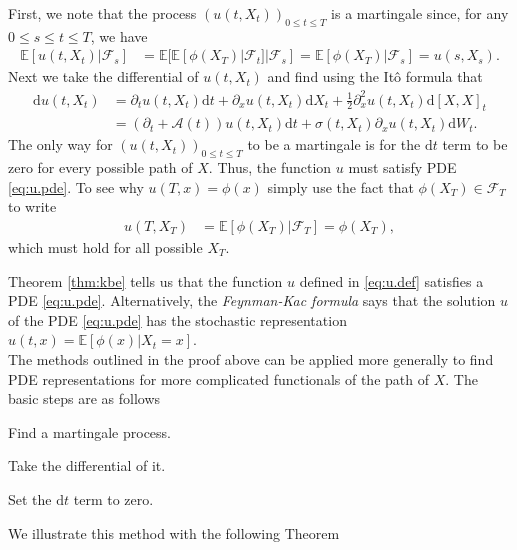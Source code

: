 \documentclass[12pt]{book}
\let\varphi\phi
\numberwithin{equation}{chapter}
\theoremstyle{plain}
\numberwithin{theorem}{section}
\theoremstyle{definition}
\numberwithin{exercise}{chapter}
\let\oldendproof\endproof
\renewenvironment{proof}[1][\proofname]{%
  \oldproof[\scshape\underline{#1}]%
}{\oldendproof}
\newcommand{\<}{\langle}
\renewcommand{\>}{\rangle}
\renewcommand{\(}{\left(}
\renewcommand{\)}{\right)}
\renewcommand{\[}{\left[}
\renewcommand{\]}{\right]}
\newcommand\Eb{\mathds{E}}
\newcommand\Ac{\mathscr{A}}
\newcommand\Fc{\mathscr{F}}
\newcommand\sig{\sigma}
\renewcommand\d{\partial}
\newcommand\dd{\mathrm{d}}
\begin{document}
\begin{proof}
First, we note that the process $(u(t,X_t))_{0 \leq t \leq T}$ is a martingale since, for any $0 \leq s \leq t \leq T$, we have
\begin{align}
\Eb[ u(t,X_t) | \Fc_s ]
	&=	\Eb[\Eb[ \varphi(X_T) | \Fc_t ] | \Fc_s ] 
	=		\Eb[ \varphi(X_T) | \Fc_s ]
	=		u(s,X_s) .
\end{align}
Next we take the differential of $u(t,X_t)$ and find using the It\^o formula that
\begin{align}
\dd u(t,X_t)
	&=	\d_t u(t,X_t) \dd t + \d_x u(t,X_t) \dd X_t + \tfrac{1}{2} \d_x^2 u(t,X_t) \dd[X,X]_t \\
	&=	\( \d_t + \Ac(t) \) u(t,X_t) \dd t + \sig(t,X_t) \d_x u(t,X_t) \dd W_t .
\end{align}
The only way for $(u(t,X_t))_{0 \leq t \leq T}$ to be a martingale is for the $\dd t$ term to be zero for every possible path of $X$.  Thus, the function $u$ must satisfy PDE \eqref{eq:u.pde}.  To see why $u(T,x) = \varphi(x)$ simply use the fact that $\varphi(X_T) \in \Fc_T$ to write
\begin{align}
u(T,X_T)
	&=	\Eb[ \varphi(X_T) | \Fc_T ]
	=		\varphi( X_T ) ,
\end{align}
which must hold for all possible $X_T$.
\end{proof}

\noindent
Theorem \ref{thm:kbe} tells us that the function $u$ defined in \eqref{eq:u.def} satisfies a PDE \eqref{eq:u.pde}.  Alternatively, the \emph{Feynman-Kac formula} says that the solution $u$ of the PDE \eqref{eq:u.pde} has the stochastic representation $u(t,x) = \Eb[ \varphi(x) | X_t = x ]$.
\\[0.5em]
The methods outlined in the proof above can be applied more generally to find PDE representations for more complicated functionals of the path of $X$.  The basic steps are as follows
\begin{enumerate*}
\item Find a martingale process.
\item Take the differential of it.
\item Set the $\dd t$ term to zero.
\end{enumerate*}
We illustrate this method with the following Theorem
\end{document}
